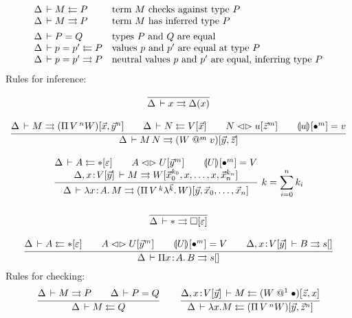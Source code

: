 \documentclass[a4paper]{article}
\makeatletter
\newcommand{\ovar}{\mathord{\bullet}}
\newcommand{\olam}[1]{\lambda^{#1}.\,}
\newcommand{\opi}[2]{\Pi\,#1\,^{#2}}
\newcommand{\lrhd}{\mathrel{\mathord{\lhd}\mathord{\rhd}}}
\newcommand{\osyn}[3]{#1 \lrhd \esubst{#2}{#3}}
\renewcommand{\esubst}[2]{#1[#2]}
\renewcommand{\sempty}{\varepsilon}
\newcommand{\oclos}[2]{#1[#2]}
\newcommand{\ochk}[4]{#1 \der #2 \jchk \oclos{#4}{#3}}
\newcommand{\oinf}[4]{#1 \der #2 \jinf \oclos{#4}{#3}}
\newcommand{\vapp}[1]{\mathrel{@^{#1}}}
\renewcommand{\eval}[2]{\dent{#1}{}[#2]}
\newcommand{\evalid}[2]{\dent{#1}{}[\ovar^{#2}]}
\makeatother
\begin{document}
\[
\begin{array}{ll}
  \Delta \,\vdash M \leftleftarrows P & \mbox{term $M$ checks against type $P$}
  \\
  \Delta \,\vdash M \rightrightarrows P & \mbox{term $M$ has inferred type $P$}
  \\[1ex]
  \Delta \,\vdash P = Q & \mbox{types $P$ and $Q$ are equal}
  \\
  \Delta \,\vdash p = p' \leftleftarrows P & \mbox{values $p$ and $p'$ are equal at
    type $P$} 
  \\
  \Delta \,\vdash p = p' \rightrightarrows P & \mbox{neutral values $p$ and $p'$ are
    equal, inferring type $P$} 
  \\
\end{array}
\]
Rules for inference:
\begin{gather*}
  \ru{}{\Delta \der x \jinf \Delta(x)}
\\[2ex]
  \ru{\oinf \Delta M {\vec x,{\vec y}^n} {(\opi V n W)} \qquad
      \ochk \Delta N {\vec x} V \qquad
      \osyn N u {{\vec z}^m} \qquad
      \eval u {\ovar^m} = v
    }{\oinf \Delta {M\,N} {\vec y,\vec z} {(W \vapp m v)}} 
\\[2ex]
  \rux{\ochk \Delta A {\sempty} \ttype \qquad
      \osyn A U {{\vec y}^m} \qquad
      \evalid U m = V \\
      \oinf {\Delta, x \of \oclos V {\vec y}} M 
            {{\vec x_0}^{k_0},x,\dots,x,{\vec x_n}^{k_n}} W
    }{\oinf \Delta {\lambda x \of A.\,M} {\vec y,\vec x_0,\dots,\vec x_n} 
            {(\opi V {k} {\olam {\vec k} W})}
    }{k = \sum_{i=0}^n k_i}
\\[2ex]
  \ru{}{\oinf \Delta \ttype {\sempty} \tkind}
\\[2ex]
  \ru{\ochk \Delta A {\sempty} \ttype \qquad
      \osyn A U {{\vec y}^m} \qquad
      \evalid U m = V \qquad
      \oinf {\Delta, x \of \oclos V {\vec y}} B {} s
    }{\oinf \Delta {\Pi x \of A.\,B} {} s}
\end{gather*}
Rules for checking:
\begin{gather*}
  \ru{\Delta \der M \jinf P \qquad
      \Delta \der P = Q
    }{\Delta \der M \jchk Q}
\qquad
  \ru{\ochk {\Delta, x \of \oclos V {\vec y}} M {\vec z,x} {(W \vapp 1 \ovar)}
    }{\ochk \Delta {\lambda x.M} {\vec y,{\vec z}^n} {(\opi V n W)}}
\end{gather*}
\end{document}

